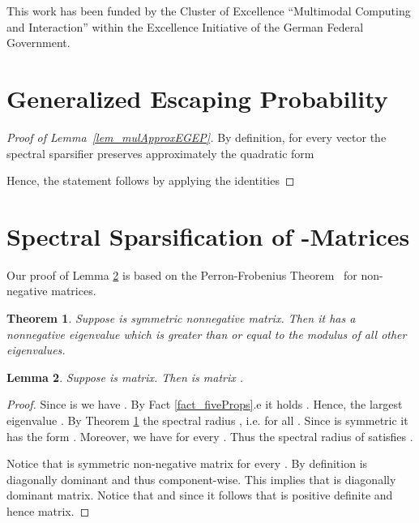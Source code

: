 \documentclass[11pt]{article}
\newtheorem{thm}{Theorem}  \newtheorem{fact}[thm]{Fact}
\newtheorem{lem}[thm]{Lemma}
\numberwithin{thm}{section}
\begin{document}
This work has been funded by the Cluster of Excellence ``Multimodal Computing and Interaction'' within the Excellence Initiative of the German Federal Government.























\appendix

\section{Generalized Escaping Probability}\label{appsec:GenEscProb}

\begin{proof}[Proof of Lemma~\ref{lem_mulApproxEGEP}]
By definition, for every vector  the spectral sparsifier  preserves approximately the quadratic form

Hence, the statement follows by applying the identities

\end{proof}



\section{Spectral Sparsification of -Matrices}\label{appsec:GLM}


Our proof of Lemma \ref{lem_SDDM_Closure} is based on the Perron-Frobenius Theorem~\cite{M73} for non-negative matrices.

\begin{thm}\label{thm_PF_NNM}\cite[Perron-Frobenius]{M73}
Suppose  is symmetric nonnegative matrix. Then it has a nonnegative eigenvalue  which is greater than or equal to the modulus of all other eigenvalues.
\end{thm}

\begin{lem}\label{lem_SDDM_Closure}
Suppose  is  matrix. Then  is  matrix .
\end{lem}

\begin{proof}
Since  is  we have . By Fact \ref{fact_fiveProps}.e it holds . Hence, the largest eigenvalue . By Theorem \ref{thm_PF_NNM} the spectral radius , i.e.  for all . Since  is symmetric it has the form . Moreover, we have  for every . Thus the spectral radius of  satisfies .

Notice that  is symmetric non-negative matrix for every . By definition  is diagonally dominant and thus  component-wise. This implies that  is diagonally dominant matrix. Notice that  and since  it follows that  is positive definite and hence  matrix.
\end{proof}
\end{document}
